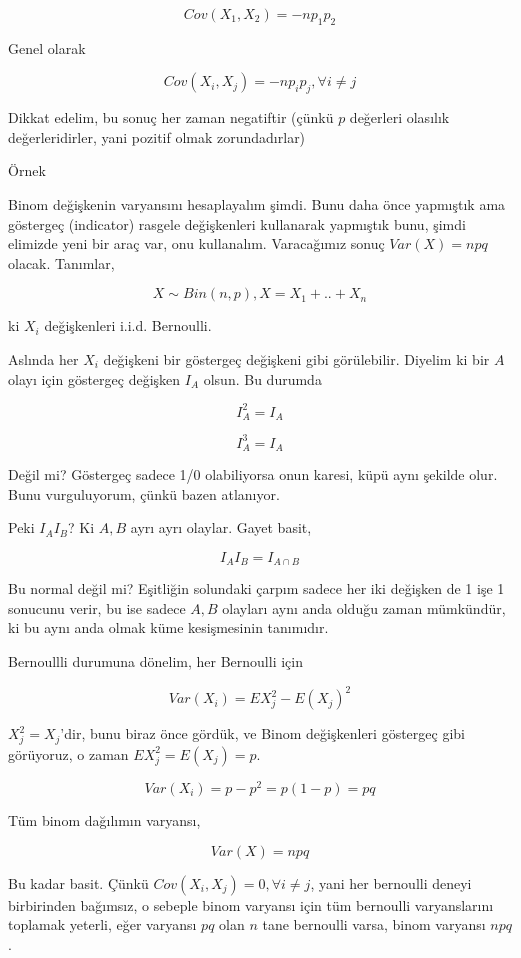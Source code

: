 \documentclass[12pt,fleqn]{article}\usepackage{../../common}
\begin{document}
$$ Cov(X_1,X_2) = -np_1p_2 $$

Genel olarak 

$$ Cov(X_i,X_j) = -np_ip_j, \forall i \ne j $$

Dikkat edelim, bu sonuç her zaman negatiftir (çünkü $p$ değerleri olasılık
değerleridirler, yani pozitif olmak zorundadırlar)

Örnek

Binom değişkenin varyansını hesaplayalım şimdi. Bunu daha önce yapmıştık
ama göstergeç (indicator) rasgele değişkenleri kullanarak yapmıştık bunu,
şimdi elimizde yeni bir araç var, onu kullanalım. Varacağımız sonuç 
$Var(X) = npq$ olacak. Tanımlar,

$$ X \sim Bin(n,p), X = X_1+..+X_n $$

ki $X_i$ değişkenleri i.i.d. Bernoulli. 

Aslında her $X_i$ değişkeni bir göstergeç değişkeni gibi
görülebilir. Diyelim ki bir $A$ olayı için göstergeç değişken $I_A$
olsun. Bu durumda

$$ I_A^2 = I_A $$

$$ I_A^3 = I_A $$

Değil mi? Göstergeç sadece 1/0 olabiliyorsa onun karesi, küpü aynı şekilde
olur. Bunu vurguluyorum, çünkü bazen atlanıyor. 

Peki $I_AI_B$? Ki $A,B$ ayrı ayrı olaylar. Gayet basit, 

$$ I_AI_B = I_{A \cap B} $$

Bu normal değil mi? Eşitliğin solundaki çarpım sadece her iki değişken de 1
işe 1 sonucunu verir, bu ise sadece $A,B$ olayları aynı anda olduğu zaman
mümkündür, ki bu aynı anda olmak küme kesişmesinin tanımıdır. 

Bernoullli durumuna dönelim, her Bernoulli için

$$ Var(X_i) = EX_j^2 - E(X_j)^2 $$

$X_j^2 = X_j$'dir, bunu biraz önce gördük, ve Binom değişkenleri göstergeç
gibi görüyoruz, o zaman $EX_j^2 = E(X_j) = p$. 

$$ Var(X_i) = p - p^2 = p(1-p) = pq$$

Tüm binom dağılımın varyansı, 

$$ Var(X) = npq $$

Bu kadar basit. Çünkü $Cov(X_i,X_j)=0,\forall i \ne j$, yani her bernoulli
deneyi birbirinden bağımsız, o sebeple binom varyansı için tüm bernoulli
varyanslarını toplamak yeterli, eğer varyansı $pq$ olan $n$ tane bernoulli
varsa, binom varyansı $npq$. 
\end{document}
